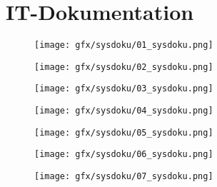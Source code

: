 \chapter{IT-Dokumentation}
\label{ch:xmls}
\begin{figure}[h]
	\centering
	\texttt{[image: gfx/sysdoku/01\_sysdoku.png]}
	\caption*{}
	\label{fig:xmls:abb1}
\end{figure}
\begin{figure}[h]
	\centering
	\texttt{[image: gfx/sysdoku/02\_sysdoku.png]}
	\caption*{}
	\label{fig:xmls:abb2}
\end{figure}
\begin{figure}[h]
	\centering
	\texttt{[image: gfx/sysdoku/03\_sysdoku.png]}
	\caption*{}
	\label{fig:xmls:abb3}
\end{figure}
\begin{figure}[h]
	\centering
	\texttt{[image: gfx/sysdoku/04\_sysdoku.png]}
	\caption*{}
	\label{fig:xmls:abb4}
\end{figure}
\begin{figure}[h]
	\centering
	\texttt{[image: gfx/sysdoku/05\_sysdoku.png]}
	\caption*{}
	\label{fig:xmls:abb5}
\end{figure}
\begin{figure}[h]
	\centering
	\texttt{[image: gfx/sysdoku/06\_sysdoku.png]}
	\caption*{}
	\label{fig:xmls:abb6}
\end{figure}
\begin{figure}[h]
	\centering
	\texttt{[image: gfx/sysdoku/07\_sysdoku.png]}
	\caption*{}
	\label{fig:xmls:abb7}
\end{figure}
